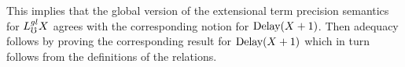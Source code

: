 This implies that the global version of the extensional term precision semantics for
$L_\mho^{gl} X$ agrees with the corresponding notion for $\text{Delay}(X + 1)$.
Then adequacy follows by proving the corresponding
result for $\text{Delay}(X + 1)$ which in turn follows from the definitions of the relations.



